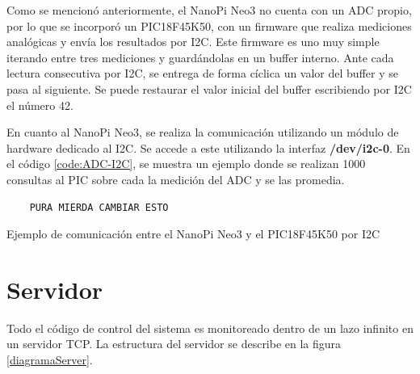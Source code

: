 \documentclass[12pt,letterpaper]{article}     %
\begin{document}
Como se mencionó anteriormente, el NanoPi Neo3 no cuenta con un ADC propio, por lo que se incorporó un 
PIC18F45K50, con un firmware que realiza mediciones analógicas y envía los resultados por I2C.
Este firmware es uno muy simple iterando entre tres mediciones y guardándolas en un buffer interno.
Ante cada lectura consecutiva por I2C, se entrega de forma cíclica un valor del buffer y se pasa al siguiente.
Se puede restaurar el valor inicial del buffer escribiendo por I2C el número 42.

En cuanto al NanoPi Neo3, se realiza la comunicación utilizando un módulo de hardware dedicado al I2C.
Se accede a este utilizando la interfaz \textbf{/dev/i2c-0}. En el código \ref{code:ADC-I2C}, se muestra un
ejemplo donde se realizan 1000 consultas al PIC sobre cada la medición del ADC y se las promedia.

\begin{codigo}[!h]
	\begin{lstlisting}
	PURA MIERDA CAMBIAR ESTO
	\end{lstlisting}
	\caption{Ejemplo de comunicación entre el NanoPi Neo3 y el PIC18F45K50 por I2C}
	\label{code:ADC-I2C}
\end{codigo}

\section{Servidor}

Todo el código de control del sistema es monitoreado dentro de un lazo infinito en un servidor TCP.
La estructura del servidor se describe en la figura \ref{diagramaServer}.
\end{document}
